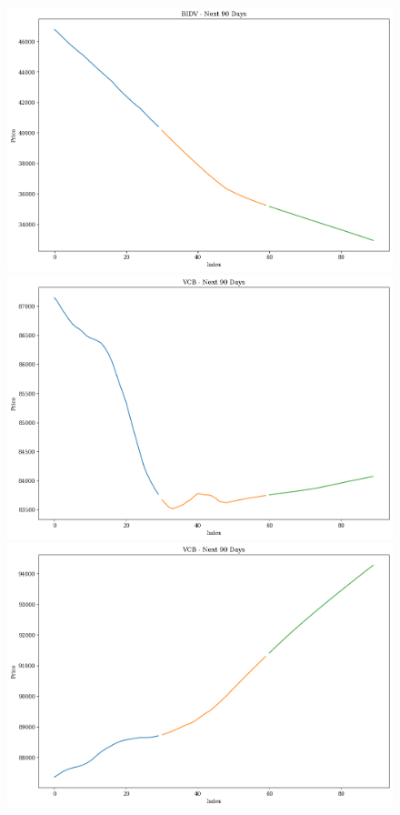 \begin{figure}[H]
\begin{minipage}{0.15\textwidth}
    \includegraphics[width=1\textwidth]{resources/chapter-5/newdata1/predicted/BIDV_N-HiTS_9-1_90Days.png}
    \end{minipage}
    \hfill
    \begin{minipage}{0.15\textwidth}
    \centering
    \includegraphics[width=1\textwidth]{resources/chapter-5/newdata1/predicted/VCB_N-HiTS_7-3_90Days.png}
    \end{minipage}
    \hfill
    \begin{minipage}{0.15\textwidth}
    \centering
    \includegraphics[width=1\textwidth]{resources/chapter-5/newdata1/predicted/VCB_N-HiTS_8-2_90Days.png}

\end{minipage}
\end{figure}
